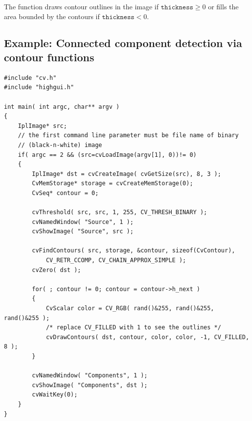 \begin{description}
\end{description}

The function draws contour outlines in the image if $\texttt{thickness} \ge 0$ or fills the area bounded by the contours if $ \texttt{thickness}<0$.

\ifC
\subsection{Example: Connected component detection via contour functions}
\begin{lstlisting}
#include "cv.h"
#include "highgui.h"

int main( int argc, char** argv )
{
    IplImage* src;
    // the first command line parameter must be file name of binary 
    // (black-n-white) image
    if( argc == 2 && (src=cvLoadImage(argv[1], 0))!= 0)
    {
        IplImage* dst = cvCreateImage( cvGetSize(src), 8, 3 );
        CvMemStorage* storage = cvCreateMemStorage(0);
        CvSeq* contour = 0;

        cvThreshold( src, src, 1, 255, CV_THRESH_BINARY );
        cvNamedWindow( "Source", 1 );
        cvShowImage( "Source", src );

        cvFindContours( src, storage, &contour, sizeof(CvContour), 
			CV_RETR_CCOMP, CV_CHAIN_APPROX_SIMPLE );
        cvZero( dst );

        for( ; contour != 0; contour = contour->h_next )
        {
            CvScalar color = CV_RGB( rand()&255, rand()&255, rand()&255 );
            /* replace CV_FILLED with 1 to see the outlines */
            cvDrawContours( dst, contour, color, color, -1, CV_FILLED, 8 );
        }

        cvNamedWindow( "Components", 1 );
        cvShowImage( "Components", dst );
        cvWaitKey(0);
    }
}
\end{lstlisting}
\fi

